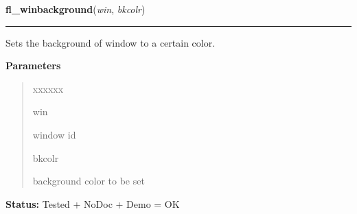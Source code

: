 \hspace{.8\funcindent}\begin{boxedminipage}{\funcwidth}

    \raggedright \textbf{fl\_winbackground}(\textit{win}, \textit{bkcolr})

    \vspace{-1.5ex}

    \rule{\textwidth}{0.5\fboxrule}
\setlength{\parskip}{2ex}
    Sets the background of window to a certain color.

\setlength{\parskip}{1ex}
      \textbf{Parameters}
      \vspace{-1ex}

      \begin{quote}
        \begin{Ventry}{xxxxxx}

          \item[win]

          window id

          \item[bkcolr]

          background color to be set

        \end{Ventry}

      \end{quote}

\textbf{Status:} Tested + NoDoc + Demo = OK



    \end{boxedminipage}

    \label{xformslib:library:fl_winbackground}

    \vspace{0.5ex}

